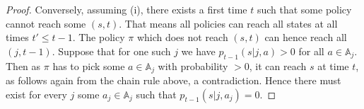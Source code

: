\documentclass{article}
\theoremstyle{definition}
\numberwithin{equation}{section}
\begin{document}
{\begin{proof}
Conversely, assuming (i), there exists a first time  $t$ such that 
some policy cannot reach some $(s,t)$. That means all policies can reach all states
at all times 
$t' \leq t-1$.
The policy $\pi$ which does not reach $(s,t)$ can hence reach all $(j, t-1)$. Suppose that for
one such $j$ we have $p_{t-1}(s|j,a) > 0$ for all $a\in \mathbb{A}_j$. Then as $\pi$ has to pick some $a\in \mathbb{A}_j$ with probability $>0$, it can reach $s$ at time $t$, as follows again from the chain rule above, 
a contradiction. Hence there must exist for every $j$ some $a_j\in \mathbb{A}_j$
such that $p_{t-1}(s|j,a_j)=0$. 
\end{proof}




}
\end{document}
